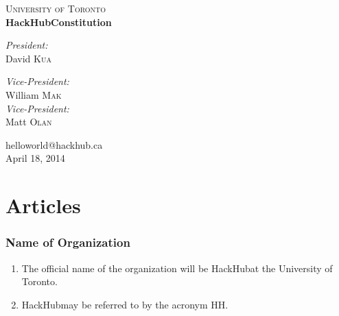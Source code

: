\documentclass[12pt]{article}
\makeatletter
\newcommand{\orgname}{HackHub\space}
\newcommand{\orgemail}{helloworld@hackhub.ca}
\newcommand{\creationdate}{April 18, 2014}
\makeatother
\begin{document}

\begin{titlepage}
\begin{center}

\textsc{\LARGE University of Toronto}\\[3.0cm]

{ \huge \bfseries \orgname Constitution\\[1.0cm] }

\begin{minipage}{0.4\textwidth}
\begin{flushleft} \large
\emph{President:}\\
David \textsc{Kua}\\
\end{flushleft}
\end{minipage}
\begin{minipage}{0.4\textwidth}
\begin{flushright} \large
\emph{Vice-President:}\\
William \textsc{Mak}\\
\emph{Vice-President:}\\
Matt \textsc{Olan}\\
\end{flushright}
\end{minipage}


\vfill

{\orgemail}\\
{\creationdate}
\end{center}
\end{titlepage}


\part{Articles}

\section{Name of Organization}
\begin{enumerate}[{1}.1]
    \item The official name of the organization will be \orgname at the University of Toronto.
    \item \orgname may be referred to by the acronym HH.
\end{enumerate}
\end{document}

